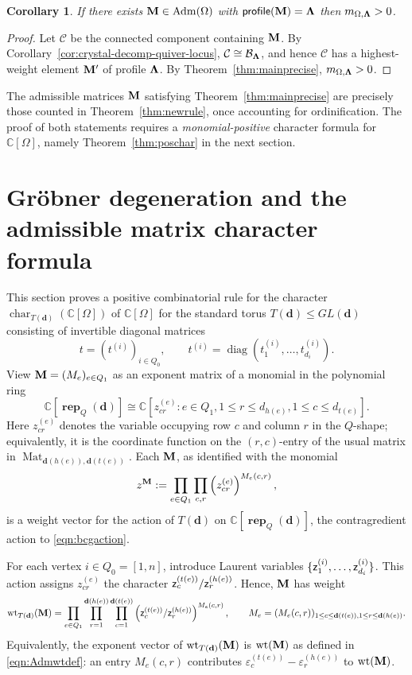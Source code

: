 \documentclass[12pt]{amsart}
\renewcommand{\d}{\mathbf{d}}
\DeclareMathOperator{\rep}{\mathbf{rep}}
\DeclareMathOperator{\Mat}{Mat}
\DeclareMathOperator{\Std}{\operatorname{Adm}}
\newtheorem{corollary}[theorem]{Corollary}
\theoremstyle{definition}
\theoremstyle{remark}
\begin{document}
\begin{corollary}\label{cor:nonzeroness}
If there exists ${\bf M}\in\Std(\Omega)$ with ${\sf profile}({\bf M})={\bf \Lambda}$ then
$m_{\Omega,{\bf \Lambda}}>0$.
\end{corollary}
\begin{proof}
Let ${\mathcal C}$ be the connected component containing ${\bf M}$.
By Corollary~\ref{cor:crystal-decomp-quiver-locus}, ${\mathcal C}\cong {\mathcal B}_{{\bf \Lambda}}$,
and hence ${\mathcal C}$ has a highest-weight element ${\bf M}'$ of
profile ${\bf \Lambda}$. By Theorem~\ref{thm:mainprecise}, $m_{\Omega,{\bf \Lambda}}>0$.
\end{proof}

The admissible matrices ${\bf M}$ satisfying Theorem~\ref{thm:mainprecise} are precisely those counted in
Theorem~\ref{thm:newrule}, once accounting for ordinification. The proof of both statements requires a \emph{monomial-positive} character
formula for ${\mathbb C}[\Omega]$, namely Theorem~\ref{thm:poschar} in the next section.

\section{Gr\"obner degeneration and the admissible matrix character formula}\label{sec:Hilbertseries}

This section proves a positive combinatorial rule for the character 
$\operatorname{char}_{T(\d)}({\mathbb C}[\Omega])$ of ${\mathbb  C}[\Omega]$ for the standard torus $T(\d)\leq GL(\d)$
consisting of invertible diagonal matrices
\[t=(t^{(i)})_{i\in Q_0}, \qquad t^{(i)}=\operatorname{diag}(t_1^{(i)},\ldots,t_{d_i}^{(i)}).\]
View ${\bf M}=(M_e)_{e\in Q_1}$ as an exponent matrix of a monomial in the polynomial ring
\[{\mathbb C}[\rep_Q(\d)]\cong {\mathbb C}[z_{cr}^{(e)}: e\in Q_1, 1\leq r\leq d_{h(e)}, 1\leq c\leq d_{t(e)}].\]
Here $z^{(e)}_{cr}$ denotes the variable occupying row $c$ and
column $r$ in the $Q$-shape; equivalently, it is the
coordinate function on the $(r,c)$-entry of the usual matrix in
$\Mat_{\d(h(e)),\d(t(e))}$. 
Each ${\bf M}$, as identified with the monomial 
\[z^{\bf M}:=\prod_{e\in Q_1}\prod_{c,r}
\left(z^{(e)}_{cr}\right)^{M_e(c,r)},\]
 is a weight vector for the action of $T(\d)$ on
${\mathbb C}[\rep_Q(\d)]$, 
the contragredient action to \eqref{eqn:bcgaction}. 

For each vertex $i\in Q_0=[1,n]$, introduce Laurent variables $\{{\sf z}_1^{(i)},\ldots,{\sf z}_{d_i}^{(i)}\}$.
This action 
assigns $z_{cr}^{(e)}$ the character ${\sf z}_c^{(t(e))}/{\sf z}^{(h(e))}_{r}$. Hence, ${\bf M}$ has weight
\[\operatorname{wt}_{T(\d)}({\bf M})=\prod_{e\in Q_1} 
\prod_{r=1}^{\d(h(e))} \prod_{c=1}^{\d(t(e))} \left({\sf z}_c^{(t(e))}/{\sf z}_r^{(h(e))}\right)^{M_e(c,r)}, \qquad
M_e=(M_e(c,r))_{1\leq c\leq \d(t(e)), 1\leq r\leq \d(h(e))}.\]
Equivalently, the exponent vector of
$\operatorname{wt}_{T({\bf d})}({\bf M})$ is
$\operatorname{wt}({\bf M})$ as defined in \eqref{eqn:Admwtdef}: an entry $M_e(c,r)$ contributes
$\varepsilon_c^{(t(e))}-\varepsilon_r^{(h(e))}$ to $\operatorname{wt}({\bf M})$.
 
\end{document}
